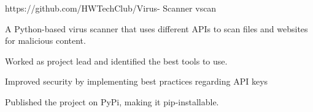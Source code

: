 \begin{cventries}
\cventry
{https://github.com/HWTechClub/Virus- Scanner} %
{vscan} %
{}
{}
{
	\begin{cvitems} %
		\item A Python-based virus scanner that uses different APIs to scan files and websites for malicious content.
		\item Worked as project lead and identified the best tools to use.
		\item Improved security by implementing best practices regarding API keys
		\item Published the project on PyPi, making it pip-installable.
	\end{cvitems}
}
\end{cventries}

